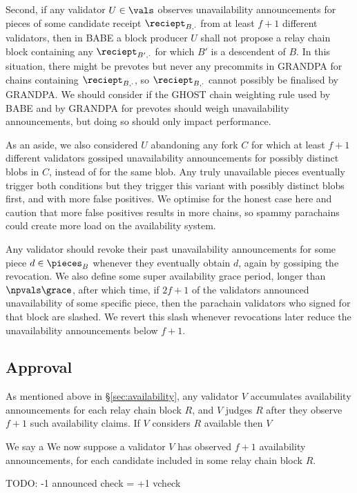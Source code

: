 Second, if any validator $U \in \vals$ observes unavailability announcements for pieces of some candidate receipt $\reciept_{B,\cdot}$ from at least $f+1$ different validators, then in BABE a block producer $U$ shall not propose a relay chain block containing any $\reciept_{B',\cdot}$ for which $B'$ is a descendent of $B$.
In this situation, there might be prevotes but never any precommits in GRANDPA for chains containing  $\reciept_{B,\cdot}$, so $\reciept_{B,\cdot}$ cannot possibly be finalised by GRANDPA.  We should consider if the GHOST chain weighting rule used by BABE and by GRANDPA for prevotes should weigh unavailability announcements, but doing so should only impact performance.

As an aside, we also considered $U$ abandoning any fork $C$ for which at least $f+1$ different validators gossiped unavailability announcements for possibly distinct blobs in $C$, instead of for the same blob.  Any truly unavailable pieces eventually trigger both conditions but they trigger this variant with possibly distinct blobs first, and with more false positives.  We optimise for the honest case here and caution that more false positives results in more chains, so spammy parachains could create more load on the availability system.

Any validator should revoke their past unavailability announcements for some piece $d \in \pieces_B$ whenever they eventually obtain $d$, again by gossiping the revocation.  We also define some super availability grace period, longer than $\npvals \grace$, after which time, if $2 f + 1$ of the validators announced unavailability of some specific piece, then the parachain validators who signed for that block are slashed.
We revert this slash whenever revocations later reduce the unavailability announcements below $f+1$.


\subsection{Approval}
\label{sec:approval}

As mentioned above in \S\ref{sec:availability}, any validator $V$ accumulates availability announcements for each relay chain block $R$, and $V$ judges $R$ after they observe $f+1$ such availability claims.  If $V$ considers $R$ available then $V$ 

We say a
We now suppose a validator $V$ has observed $f+1$ availability announcements,  for each candidate included in some relay chain block $R$.



TODO:  -1 announced check = +1 vcheck




